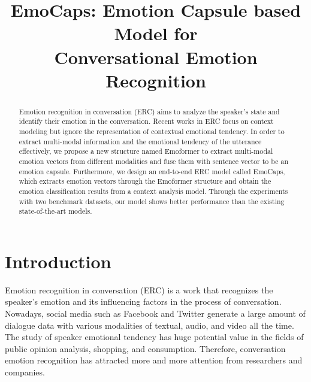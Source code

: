 \title{EmoCaps: Emotion Capsule based Model for\\ 
	Conversational Emotion Recognition}



\maketitle
\begin{abstract}
	Emotion recognition in conversation (ERC) aims to analyze the speaker's state and identify their emotion in the conversation. Recent works in ERC focus on context modeling but ignore the representation of contextual emotional tendency. In order to extract multi-modal information and the emotional tendency of the utterance effectively, we propose a new structure named Emoformer to extract multi-modal emotion vectors from different modalities and fuse them with sentence vector to be an emotion capsule. Furthermore, we design an end-to-end ERC model called EmoCaps, which extracts emotion vectors through the Emoformer structure and obtain the emotion classification results from a context analysis model. Through the experiments with two benchmark datasets, our model shows better performance than the existing state-of-the-art models.
\end{abstract}
\section{Introduction}
Emotion recognition in conversation (ERC) is a work that recognizes the speaker's emotion and its influencing factors in the process of conversation. Nowadays, social media such as Facebook and Twitter generate a large amount of dialogue data with various modalities of textual, audio, and video all the time. The study of speaker emotional tendency has huge potential value in the fields of public opinion analysis, shopping, and consumption. Therefore, conversation emotion recognition has attracted more and more attention from researchers and companies. 

